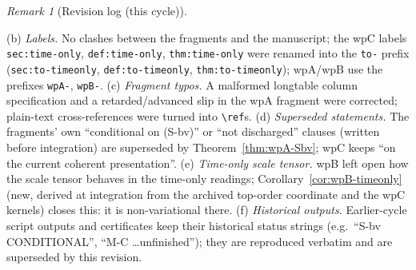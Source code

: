 \documentclass{article}
\theoremstyle{remark}
\newtheorem{remark}[proposition]{Remark}
\begin{document}
\begin{remark}[Revision log (this cycle)]
\begin{enumerate}
(b) \emph{Labels.} No clashes between the fragments and the manuscript; the wpC labels \texttt{sec:time-only}, \texttt{def:time-only}, \texttt{thm:time-only} were renamed into the \texttt{to-} prefix (\texttt{sec:to-timeonly}, \texttt{def:to-timeonly}, \texttt{thm:to-timeonly}); wpA/wpB use the prefixes \texttt{wpA-}, \texttt{wpB-}.
(c) \emph{Fragment typos.} A malformed longtable column specification and a retarded/advanced slip in the wpA fragment were corrected; plain-text cross-references were turned into \verb|\ref|s.
(d) \emph{Superseded statements.} The fragments' own ``conditional on (S-bv)'' or ``not discharged'' clauses (written before integration) are superseded by Theorem~\ref{thm:wpA-Sbv}; wpC keeps ``on the current coherent presentation''.
(e) \emph{Time-only scale tensor.} wpB left open how the scale tensor behaves in the time-only readings; Corollary~\ref{cor:wpB-timeonly} (new, derived at integration from the archived top-order coordinate and the wpC kernels) closes this: it is non-variational there.
(f) \emph{Historical outputs.} Earlier-cycle script outputs and certificates keep their historical status strings (e.g.\ ``S-bv CONDITIONAL'', ``M-C \dots unfinished''); they are reproduced verbatim and are superseded by this revision.
\end{enumerate}
\end{remark}
\end{document}

